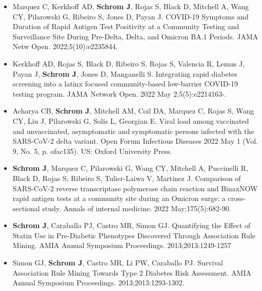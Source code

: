 \documentclass[11pt]{article}
\begin{document}
\begin{itemize}
    \item Marquez C, Kerkhoff AD, \textbf{Schrom J}, Rojas S, Black D, Mitchell A, Wang CY, Pilarowski G, Ribeiro S, Jones D, Payan J. COVID-19 Symptoms and Duration of Rapid Antigen Test Positivity at a Community Testing and Surveillance Site During Pre-Delta, Delta, and Omicron BA.1 Periods. JAMA Netw Open. 2022;5(10):e2235844.
    \item Kerkhoff AD, Rojas S, Black D, Ribeiro S, Rojas S, Valencia R, Lemus J, Payan J, \textbf{Schrom J}, Jones D, Manganelli S. Integrating rapid diabetes screening into a latinx focused community-based low-barrier COVID-19 testing program. JAMA Network Open. 2022 May 2;5(5):e2214163-.
    \item Acharya CB, \textbf{Schrom J}, Mitchell AM, Coil DA, Marquez C, Rojas S, Wang CY, Liu J, Pilarowski G, Solis L, Georgian E. Viral load among vaccinated and unvaccinated, asymptomatic and symptomatic persons infected with the SARS-CoV-2 delta variant. Open Forum Infectious Diseases 2022 May 1 (Vol. 9, No. 5, p. ofac135). US: Oxford University Press.
    \item \textbf{Schrom J}, Marquez C, Pilarowski G, Wang CY, Mitchell A, Puccinelli R, Black D, Rojas S, Ribeiro S, Tulier-Laiwa V, Martinez J. Comparison of SARS-CoV-2 reverse transcriptase polymerase chain reaction and BinaxNOW rapid antigen tests at a community site during an Omicron surge: a cross-sectional study. Annals of internal medicine. 2022 May;175(5):682-90.
    \item \textbf{Schrom J}, Caraballo PJ, Castro MR, Simon GJ. Quantifying the Effect of Statin Use in Pre-Diabetic Phenotypes Discovered Through Association Rule Mining. AMIA Annual Symposium Proceedings. 2013;2013:1249-1257 
    \item Simon GJ, \textbf{Schrom J}, Castro MR, Li PW, Caraballo PJ. Survival Association Rule Mining Towards Type 2 Diabetes Risk Assessment. AMIA Annual Symposium Proceedings. 2013;2013:1293-1302. 
\end{itemize}
\end{document}
